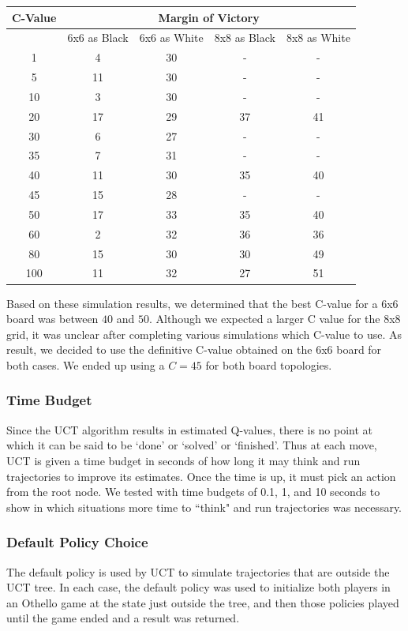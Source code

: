 \documentclass[12pt,letterpaper]{article}
\begin{document}
\begin{tabular}{|c|c|c|c|c|}
\hline
C-Value & \multicolumn{4}{c|}{Margin of Victory}\\
\hline 
 & 6x6 as Black & 6x6 as White & 8x8 as Black & 8x8 as White \\ 
\hline 
1 & 4 & 30 & - & - \\ 
\hline 
5 & 11 & 30 & - & - \\ 
\hline 
10 & 3 & 30 & - & - \\ 
\hline 
20 & 17 & 29 & 37 & 41 \\ 
\hline 
30 & 6 & 27 & - & - \\ 
\hline 
35 & 7 & 31 & - & - \\ 
\hline 
40 & 11 & 30 & 35 & 40 \\ 
\hline 
45 & 15 & 28 & - & - \\ 
\hline 
50 & 17 & 33 & 35 & 40 \\ 
\hline 
60 & 2 & 32 & 36 & 36 \\ 
\hline 
80 & 15 & 30 & 30 & 49 \\ 
\hline 
100 & 11 & 32 & 27 & 51 \\ 
\hline 
\end{tabular} 
\linebreak
Based on these simulation results, we determined that the best C-value for a 6x6 board was between $40$ and $50$. Although we expected a larger C value for the 8x8 grid, it was unclear after completing various simulations which C-value to use. As result, we decided to use the definitive C-value obtained on the 6x6 board for both cases.  We ended up using a $C=45$ for both board topologies.

\subsubsection{Time Budget}
Since the UCT algorithm results in estimated Q-values, there is no point at which it can be said to be `done' or `solved' or `finished'. Thus at each move, UCT is given a time budget in seconds of how long it may think and run trajectories to improve its estimates. Once the time is up, it must pick an action from the root node. We tested with time budgets of 0.1, 1, and 10 seconds to show in which situations more time to ``think" and run trajectories was necessary.

\subsubsection{Default Policy Choice}
The default policy is used by UCT to simulate trajectories that are outside the UCT tree. In each case, the default policy was used to initialize both players in an Othello game at the state just outside the tree, and then those policies played until the game ended and a result was returned.
\end{document}

